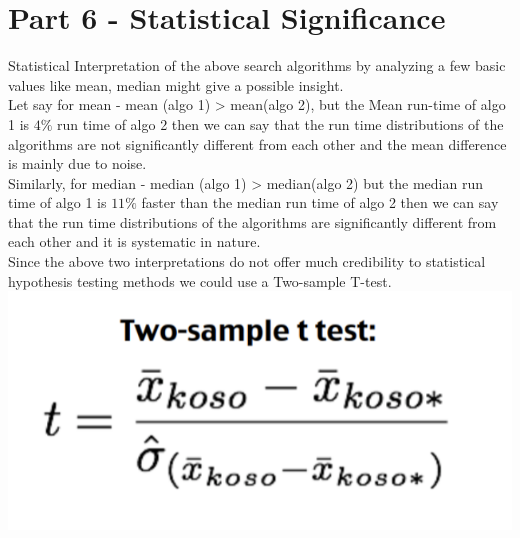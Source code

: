 \documentclass{article}
\begin{document}
\section*{Part 6 - Statistical Significance}
\begin{flushleft}
Statistical Interpretation of the above search algorithms by analyzing a few basic values like mean, median might give a possible insight. \\
Let say for mean - mean (algo 1) > mean(algo 2), but the Mean run-time of algo 1 is $4\%$
run time of algo 2 then we can say that the run time distributions of the algorithms are not significantly different from each other and the mean difference is mainly due to noise. \\
Similarly, for median - median (algo 1) > median(algo 2) but the median run time of algo 1 is $11\%$ faster than
the median run time of algo 2 then we can say that the run time distributions of the algorithms are significantly different from each other and it is systematic in nature. \\
Since the above two interpretations do not offer much credibility to statistical hypothesis testing
methods we could use a Two-sample T-test. \\
\includegraphics{test.png}
\end{flushleft}
\end{document}
